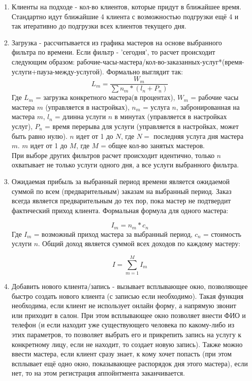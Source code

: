 \documentclass[DIV=calc, paper=a4, fontsize=11pt]{scrartcl} %
\begin{document}
    \begin{enumerate}          
        \item Клиенты на подходе - кол-во клиентов, которые придут в ближайшее время. Стандартно идут ближайшие 4 клиента с возможностью подгрузки ещё 4 и так итеративно до подгрузки всех клиентов текущего дня.
        \item Загрузка - рассчитывается из графика мастеров на основе выбранного фильтра по времени. Если фильтр - 'сегодня', то расчет происходит следующим образом: рабочие-часы-мастера/кол-во-заказанных-услуг*(время-услуги+пауза-между-услугой). Формально выглядит так: 
            $$
            L_m = \frac{W_m}{\sum n_m * (l_n + P_n)}
            $$
Где $L_m$ = загрузка конкретного мастера(в процентах), $W_m$ = рабочие часы мастера $m$ (управляется в настройках), $n_m$ = услуга $n$, забронированная на мастера $m$, $l_n$ = длинна услуги $n$ в минутах (управляется в настройках услуг), $P_n$ = время перерыва для услуги (управляется в настройках, может быть равно нулю). $n$ идет от 1 до $N$, где $N =$ последняя услуга дня мастера $m$. $m$ идет от 1 до $M$, где $M$ = общее кол-во занятых мастеров.
\\[0.5cm]
При выборе других фильтров расчет происходит идентично, только $n$ охватывает не только услуги одного дня, а все услуги выбранного фильтра.
        \item Ожидаемая прибыль за выбранный период времени является ожидаемой суммой по всем (предварительным) заказам на выбранный период. Заказ всегда является предварительным до тех пор, пока мастер не подтвердит фактический приход клиента. Формальная формула для одного мастера:
            
            $$
            I_m = n_m * c_n
            $$
Где $I_m$ = возможный приход мастера за выбранный период, $c_n$ = стоимость услуги $n$. Общий доход является суммой всех доходов по каждому мастеру:

            $$
            I = \sum_{m=1}^M I_m
            $$

        \item \label{paragraph:add_new_client}Добавить нового клиента/запись - вызывает всплывающее окно, позволяющее быстро создать нового клиента (с записью если необходимо). Такая функция необходима, если клиент не использует онлайн форму, а напрямую звонит или приходит в салон. При этом всплывающее окно позволяет внести ФИО и телефон (и если находит уже существующего человека по какому-либо из этих параметров, то позволяет выбрать его и прикрепить запись на услугу к конкретному лицу, если не находит, то создает новую запись). Также можно ввести мастера, если клиент сразу знает, к кому хочет попасть (при этом всплывает ещё одно окно, показывающее распорядок дня этого мастера), если нет, то на этом регистрация аппойнтмента заканчивается.

    \end{enumerate}
\end{document}
